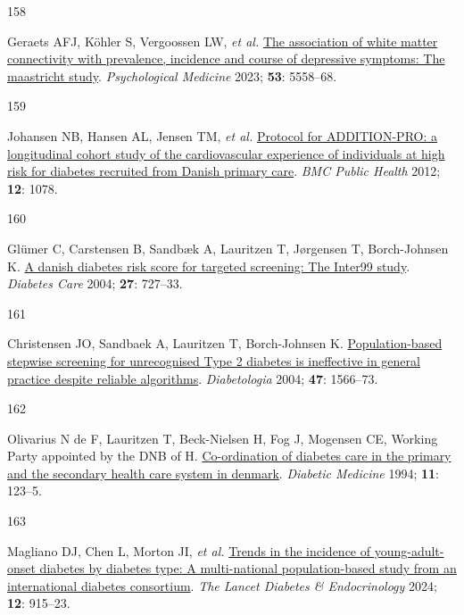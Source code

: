 \documentclass[
  letterpaper,
  headsepline=true,
  open=any]{scrbook}
\newlength{\cslhangindent}
\newlength{\csllabelwidth}
\newlength{\cslentryspacingunit} %
\newenvironment{CSLReferences}[2] %
 {%
  \setlength{\parindent}{0pt}
  \ifodd #1
  \let\oldpar\par
  \def\par{\hangindent=\cslhangindent\oldpar}
  \fi
  \setlength{\parskip}{#2\cslentryspacingunit}
 }%
 {}
\newcommand{\CSLLeftMargin}[1]{\parbox[t]{\csllabelwidth}{#1}}
\newcommand{\CSLRightInline}[1]{\parbox[t]{\linewidth - \csllabelwidth}{#1}\break}
\begin{document}
\begin{CSLReferences}{0}{0}
\leavevmode{}%
\CSLLeftMargin{158 }%
\CSLRightInline{Geraets AFJ, Köhler S, Vergoossen LW, \emph{et al.}
\href{https://doi.org/10.1017/S0033291722002768}{The association of
white matter connectivity with prevalence, incidence and course of
depressive symptoms: The maastricht study}. \emph{Psychological
Medicine} 2023; \textbf{53}: 5558--68.}

\leavevmode{}%
\CSLLeftMargin{159 }%
\CSLRightInline{Johansen NB, Hansen AL, Jensen TM, \emph{et al.}
\href{https://doi.org/10.1186/1471-2458-12-1078}{Protocol for
ADDITION-PRO: a longitudinal cohort study of the cardiovascular
experience of individuals at high risk for diabetes recruited from
Danish primary care}. \emph{BMC Public Health} 2012; \textbf{12}: 1078.}

\leavevmode{}%
\CSLLeftMargin{160 }%
\CSLRightInline{Glümer C, Carstensen B, Sandbæk A, Lauritzen T,
Jørgensen T, Borch-Johnsen K.
\href{https://doi.org/10.2337/diacare.27.3.727}{A danish diabetes risk
score for targeted screening: The Inter99 study}. \emph{Diabetes Care}
2004; \textbf{27}: 727--33.}

\leavevmode{}%
\CSLLeftMargin{161 }%
\CSLRightInline{Christensen JO, Sandbaek A, Lauritzen T, Borch-Johnsen
K. \href{https://doi.org/10.1007/s00125-004-1496-2}{Population-based
stepwise screening for unrecognised Type 2 diabetes is ineffective in
general practice despite reliable algorithms}. \emph{Diabetologia} 2004;
\textbf{47}: 1566--73.}

\leavevmode{}%
\CSLLeftMargin{162 }%
\CSLRightInline{Olivarius N de F, Lauritzen T, Beck-Nielsen H, Fog J,
Mogensen CE, Working Party appointed by the DNB of H.
\href{https://doi.org/10.1111/j.1464-5491.1994.tb00243.x}{Co-ordination
of diabetes care in the primary and the secondary health care system in
denmark}. \emph{Diabetic Medicine} 1994; \textbf{11}: 123--5.}

\leavevmode{}%
\CSLLeftMargin{163 }%
\CSLRightInline{Magliano DJ, Chen L, Morton JI, \emph{et al.}
\href{https://doi.org/10.1016/S2213-8587(24)00243-2}{Trends in the
incidence of young-adult-onset diabetes by diabetes type: A
multi-national population-based study from an international diabetes
consortium}. \emph{The Lancet Diabetes \& Endocrinology} 2024;
\textbf{12}: 915--23.}


\end{CSLReferences}
\end{document}

